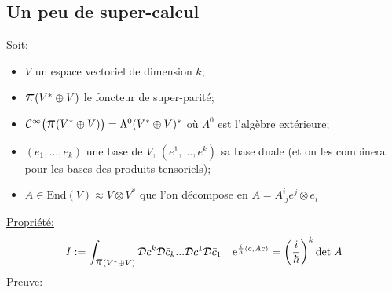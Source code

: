 \documentclass[a4paper,11pt]{article}
\newcommand{\D}{{\mathcal{D}}}
\newcommand{\e}{{\mathrm{e}}}
\newcommand{\ppi}{{\mathlarger{\mathlarger{\mathlarger{\pi}}}}}
\begin{document}
\subsection{Un peu de super-calcul}
Soit:
\begin{itemize}
\item $V$ un espace vectoriel de dimension $k$;
\item $\ppi(V^*\oplus V)$ le foncteur de super-parité;
\item $\mathcal{C}^\infty\big(\ppi(V^*\oplus V)\big) = \Lambda^0(V^*\oplus V)^*$ où $\Lambda^0$ est l'algèbre extérieure;
\item $(e_1, ..., e_k)$ une base de $V$, $(e^1, ..., e^k)$ sa base duale (et on les combinera pour les bases des produits tensoriels);
\item $A\in \mathrm{End}(V)\approx V\otimes V^*$ que l'on décompose en $A=A^i_{\;j}e^j\otimes e_i$
\end{itemize}
\underline{Propriété:}
$$
I:= \int_{\ppi(V^*\oplus V)}\D c^k \D \Bar c_k ... \D c^1 \D \Bar c_1 \quad \e^{\frac i \hbar \langle \Bar c, A c \rangle}
= \left(\frac{i}{\hbar}\right)^k \mathrm{det} \; A
$$
Preuve:
\end{document}
